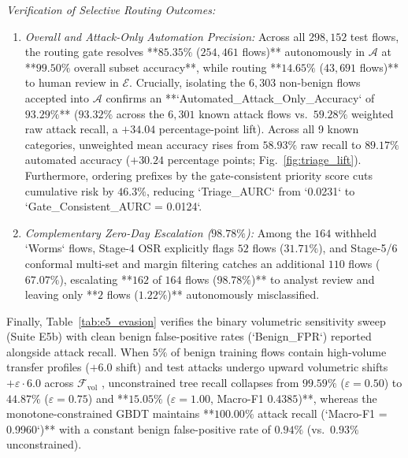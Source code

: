 ﻿\documentclass[conference]{IEEEtran}
\begin{document}
\textit{Verification of Selective Routing Outcomes:}
\begin{enumerate}
    \item \textit{Overall and Attack-Only Automation Precision:} Across all $298,152$ test flows, the routing gate resolves **$85.35\%$ ($254,461$ flows)** autonomously in $\mathcal{A}$ at **$99.50\%$ overall subset accuracy**, while routing **$14.65\%$ ($43,691$ flows)** to human review in $\mathcal{E}$. Crucially, isolating the $6,303$ non-benign flows accepted into $\mathcal{A}$ confirms an **`Automated_Attack_Only_Accuracy` of $93.29\%$** ($93.32\%$ across the $6,301$ known attack flows vs.\ $59.28\%$ weighted raw attack recall, a $+34.04$ percentage-point lift). Across all 9 known categories, unweighted mean accuracy rises from $58.93\%$ raw recall to $89.17\%$ automated accuracy ($+30.24$ percentage points; Fig.~\ref{fig:triage_lift}). Furthermore, ordering prefixes by the gate-consistent priority score cuts cumulative risk by $46.3\%$, reducing `Triage_AURC` from `0.0231` to `Gate_Consistent_AURC = 0.0124`.
    \item \textit{Complementary Zero-Day Escalation ($98.78\%$):} Among the $164$ withheld `Worms` flows, Stage-4 OSR explicitly flags $52$ flows ($31.71\%$), and Stage-5/6 conformal multi-set and margin filtering catches an additional $110$ flows ($67.07\%$), escalating **$162$ of $164$ flows ($98.78\%$)** to analyst review and leaving only **$2$ flows ($1.22\%$)** autonomously misclassified.
\end{enumerate}

Finally, Table~\ref{tab:e5_evasion} verifies the binary volumetric sensitivity sweep (Suite E5b) with clean benign false-positive rates (`Benign_FPR`) reported alongside attack recall. When $5\%$ of benign training flows contain high-volume transfer profiles ($+6.0$ shift) and test attacks undergo upward volumetric shifts $+\varepsilon \cdot 6.0$ across $\mathcal{F}_{\text{vol}}$ \cite{b15,b21}, unconstrained tree recall collapses from $99.59\%$ ($\varepsilon = 0.50$) to $44.87\%$ ($\varepsilon = 0.75$) and **$15.05\%$ ($\varepsilon = 1.00$, Macro-F1 $0.4385$)**, whereas the monotone-constrained GBDT maintains **$100.00\%$ attack recall (`Macro-F1 = 0.9960`)** with a constant benign false-positive rate of $0.94\%$ (vs.\ $0.93\%$ unconstrained).
\end{document}
